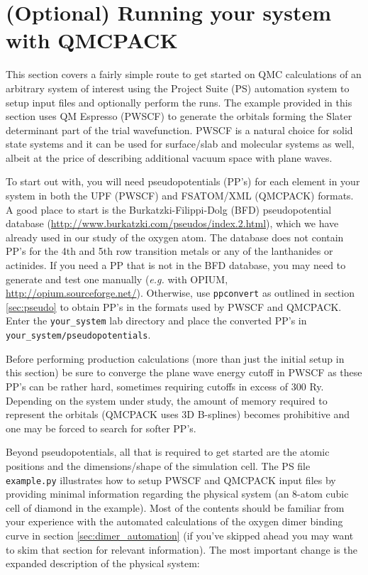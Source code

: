 \section{(Optional) Running your system with QMCPACK}\label{sec:your_system}
This section covers a fairly simple route to get started on QMC calculations of an arbitrary system of interest using the Project Suite (PS) automation system to setup input files and optionally perform the runs.  The example provided in this section uses QM Espresso (PWSCF) to generate the orbitals forming the Slater determinant part of the trial wavefunction.  PWSCF is a natural choice for solid state systems and it can be used for surface/slab and molecular systems as well, albeit at the price of describing additional vacuum space with plane waves.

To start out with, you will need pseudopotentials (PP's) for each element in your system in both the UPF (PWSCF) and FSATOM/XML (QMCPACK) formats.  A good place to start is the Burkatzki-Filippi-Dolg (BFD) pseudopotential database \newline (\href{http://www.burkatzki.com/pseudos/index.2.html}{http://www.burkatzki.com/pseudos/index.2.html}), which we have already used in our study of the oxygen atom.  The database does not contain PP's for the 4th and 5th row transition metals or any of the lanthanides or actinides.  If you need a PP that is not in the BFD database, you may need to generate and test one manually (\emph{e.g.} with OPIUM, \href{http://opium.sourceforge.net/}{http://opium.sourceforge.net/}).  Otherwise, use \texttt{ppconvert} as outlined in section \ref{sec:pseudo} to obtain PP's in the formats used by PWSCF and QMCPACK.  Enter the \texttt{your\_system} lab directory and place the converted PP's in \texttt{your\_system/pseudopotentials}.

Before performing production calculations (more than just the initial setup in this section) be sure to converge the plane wave energy cutoff in PWSCF as these PP's can be rather hard, sometimes requiring cutoffs in excess of 300 Ry.  Depending on the system under study, the amount of memory required to represent the orbitals (QMCPACK uses 3D B-splines) becomes prohibitive and one may be forced to search for softer PP's.

Beyond pseudopotentials, all that is required to get started are the atomic positions and the dimensions/shape of the simulation cell.  The PS file \texttt{example.py} illustrates how to setup PWSCF and QMCPACK input files by providing minimal information regarding the physical system (an 8-atom cubic cell of diamond in the example).  Most of the contents should be familiar from your experience with the automated calculations of the oxygen dimer binding curve in section \ref{sec:dimer_automation} (if you've skipped ahead you may want to skim that section for relevant information).  The most important change is the expanded description of the physical system:

